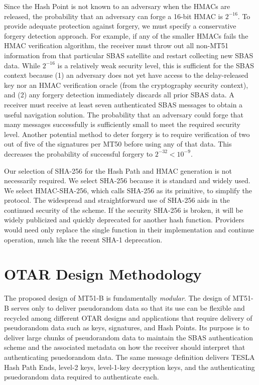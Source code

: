 \documentclass[letterpaper,times]{IONconf/IONconf}
\begin{document}
		Since the Hash Point is not known to an adversary when the HMACs are released, the probability that an adversary can forge a 16-bit HMAC is $2^{-16}$.
		To provide adequate protection against forgery, we must specify a conservative forgery detection approach.
		For example, if any of the smaller HMACs fails the HMAC verification algorithm, the receiver must throw out all non-MT51 information from that particular SBAS satellite and restart collecting new SBAS data.
		While $2^{-16}$ is a relatively weak security level, this is sufficient for the SBAS context because (1) an adversary does not yet have access to the delay-released key nor an HMAC verification oracle (from the cryptography security context), and (2) any forgery detection immediately discards all prior SBAS data.
		A receiver must receive at least seven authenticated SBAS messages to obtain a useful navigation solution.
		The probability that an adversary could forge that many messages successfully is {}sufficiently small to meet the required security level.
		Another potential method to deter forgery is to require verification of two out of five of the signatures per MT50 before using any of that data.
		This decreases the probability of successful forgery to $2^{-32} < 10^{-9}$.		

		Our selection of SHA-256 for the Hash Path and HMAC generation is not necessarily required.
		We select SHA-256 because it is standard and widely used.
		We select HMAC-SHA-256, which calls SHA-256 as its primitive, to simplify the protocol.
		The widespread and straightforward use of SHA-256 aids in the continued security of the scheme.
		If the security SHA-256 is broken, it will be widely publicized and quickly deprecated for another hash function.
		Providers would need only replace the single function in their implementation and continue operation, much like the recent SHA-1 deprecation.

\section{OTAR Design Methodology} \label{sec:otar_design_methodology}

	The proposed design of MT51-B is fundamentally {\em modular}.
	The design of MT51-B serves only to deliver pseudorandom data so that its use can be flexible and recycled among different OTAR designs and applications that require delivery of pseudorandom data such as keys, signatures, and Hash Points. 
	Its purpose is to deliver large chunks of pseudorandom data to maintain the SBAS authentication scheme and the associated metadata on how the receiver should interpret that authenticating psuedorandom data.
	The same message definition delivers TESLA Hash Path Ends, level-2 keys, level-1-key decryption keys, and the authenticating psuedorandom data required to authenticate each.
\end{document}
